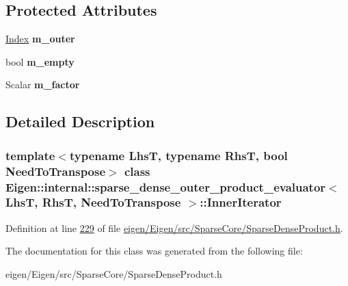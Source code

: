 \subsection*{Protected Attributes}
\begin{DoxyCompactItemize}
\item 
\mbox{\label{class_eigen_1_1internal_1_1sparse__dense__outer__product__evaluator_1_1_inner_iterator_acbef56598eb5e344e5148f34edd32950}} 
\hyperlink{namespace_eigen_a62e77e0933482dafde8fe197d9a2cfde}{Index} {\bfseries m\+\_\+outer}
\item 
\mbox{\label{class_eigen_1_1internal_1_1sparse__dense__outer__product__evaluator_1_1_inner_iterator_a9a3831282beeeb6e79c428c09e6038d5}} 
bool {\bfseries m\+\_\+empty}
\item 
\mbox{\label{class_eigen_1_1internal_1_1sparse__dense__outer__product__evaluator_1_1_inner_iterator_a18dc248d76b9934b04cce16512d9ce8c}} 
Scalar {\bfseries m\+\_\+factor}
\end{DoxyCompactItemize}


\subsection{Detailed Description}
\subsubsection*{template$<$typename LhsT, typename RhsT, bool Need\+To\+Transpose$>$\newline
class Eigen\+::internal\+::sparse\+\_\+dense\+\_\+outer\+\_\+product\+\_\+evaluator$<$ Lhs\+T, Rhs\+T, Need\+To\+Transpose $>$\+::\+Inner\+Iterator}



Definition at line \hyperlink{eigen_2_eigen_2src_2_sparse_core_2_sparse_dense_product_8h_source_l00229}{229} of file \hyperlink{eigen_2_eigen_2src_2_sparse_core_2_sparse_dense_product_8h_source}{eigen/\+Eigen/src/\+Sparse\+Core/\+Sparse\+Dense\+Product.\+h}.



The documentation for this class was generated from the following file\+:\begin{DoxyCompactItemize}
\item 
eigen/\+Eigen/src/\+Sparse\+Core/\+Sparse\+Dense\+Product.\+h\end{DoxyCompactItemize}
